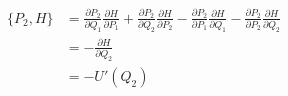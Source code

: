\documentclass{jsarticle}
\begin{document}
\begin{enumerate}
\begin{enumerate}
$$\begin{aligned}
                    \{P_2, H\} & = \frac{\partial P_2}{\partial Q_1}\frac{\partial H}{\partial P_1}
                    +\frac{\partial P_2}{\partial Q_2}\frac{\partial H}{\partial P_2}
                    - \frac{\partial P_2}{\partial P_1}\frac{\partial H}{\partial Q_1}
                    - \frac{\partial P_2}{\partial P_2}\frac{\partial H}{\partial Q_2}              \\
                               & = - \frac{\partial H}{\partial Q_2}                                \\
                               & = -U'(Q_2)
                  \end{aligned}
                $$
        \end{enumerate}

\end{enumerate}
\end{document}
